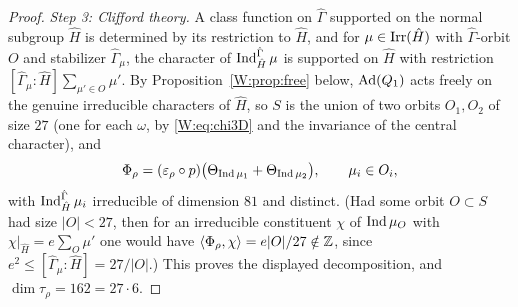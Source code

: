 \begin{proof}
\emph{Step 3: Clifford theory.}  A class function on $\hat\Gamma$
supported on the normal subgroup $\hat H$ is determined by its
restriction to $\hat H$, and for $\mu\in\operatorname{Irr}(\hat H)$ with
$\hat\Gamma$-orbit $O$ and stabilizer $\hat\Gamma_\mu$, the character of
$\operatorname{Ind}_{\hat H}^{\hat\Gamma}\mu$ is supported on $\hat H$ with restriction
$[\hat\Gamma_\mu:\hat H]\sum_{\mu'\in O}\mu'$.  By
Proposition~\ref{W:prop:free} below, $\operatorname{Ad}(Q_1)$ acts freely on the genuine
irreducible characters of $\hat H$, so $S$ is the union of two orbits
$O_1,O_2$ of size $27$ (one for each $\omega$, by \eqref{W:eq:chi3D} and
the invariance of the central character), and
\[
 \Phi_\rho=(\varepsilon_\rho\circ p)\bigl(\Theta_{\operatorname{Ind}\mu_1}+\Theta_{\operatorname{Ind}\mu_2}\bigr),\qquad \mu_i\in O_i ,
\]
with $\operatorname{Ind}_{\hat H}^{\hat\Gamma}\mu_i$ irreducible of dimension $81$ and
distinct.  (Had some orbit $O\subset S$ had size $|O|<27$, then for an
irreducible constituent $\chi$ of $\operatorname{Ind}\mu_O$ with
$\chi|_{\hat H}=e\sum_O\mu'$ one would have
$\langle\Phi_\rho,\chi\rangle=e|O|/27\notin\mathbb Z$, since
$e^2\le[\hat\Gamma_\mu:\hat H]=27/|O|$.)  This proves the displayed
decomposition, and $\dim\tau_\rho=162=27\cdot6$.
\end{proof}

